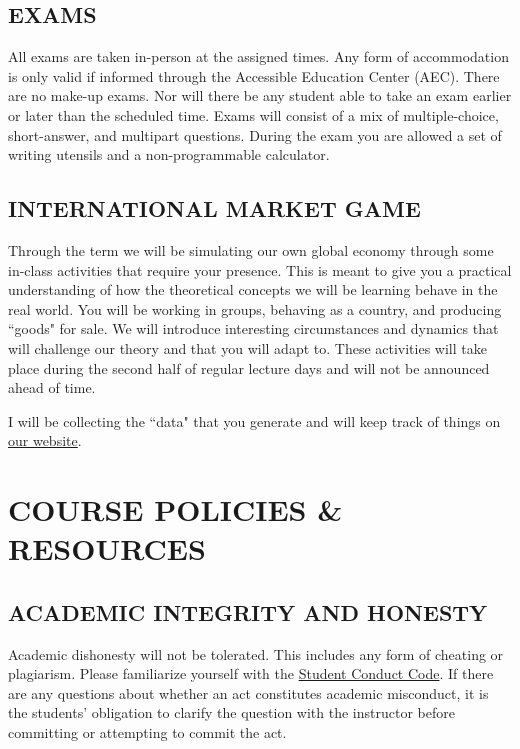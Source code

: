 \documentclass[11pt]{article}
\begin{document}
\subsection*{EXAMS}
All exams are taken in-person at the assigned times. 
Any form of accommodation is only valid if informed through the Accessible Education Center (AEC).
There are no make-up exams. 
Nor will there be any student able to take an exam earlier or later than the scheduled time. 
Exams will consist of a mix of multiple-choice, short-answer, and multipart questions. 
During the exam you are allowed a set of writing utensils and a non-programmable calculator. 

\subsection*{INTERNATIONAL MARKET GAME}

Through the term we will be simulating our own global economy through some in-class activities that require your presence.   
This is meant to give you a practical understanding of how the theoretical concepts we will be learning behave in the real world. 
You will be working in groups, behaving as a country, and producing ``goods" for sale.
We will introduce interesting circumstances and dynamics that will challenge our theory and that you will adapt to. 
These activities will take place during the second half of regular lecture days and will not be announced ahead of time. 

I will be collecting the ``data" that you generate and will keep track of things on \href{https://jrojas1003.github.io/EC-380-Intl-Econ-Issues/Activities/activities.html}{our website}.

\bigskip \bigskip 

\section*{COURSE POLICIES \& RESOURCES}

\subsection*{ACADEMIC INTEGRITY AND HONESTY}
Academic dishonesty will not be tolerated.
This includes any form of cheating or plagiarism.
Please familiarize yourself with the \href{https://policies.uoregon.edu/vol-3-administration-student-affairs/ch-1-conduct/student-conduct-code}{Student Conduct Code}.
If there are any questions about whether an act constitutes academic misconduct, it is the students' obligation to clarify the question with the instructor before committing or attempting to commit the act.
\end{document}
